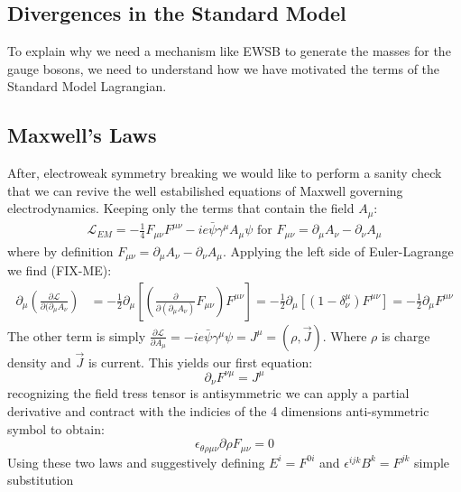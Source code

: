 \subsection{Divergences in the Standard Model} 

To explain why we need a mechanism like EWSB to generate the masses for the gauge bosons, we need to understand how we
have motivated the terms of the Standard Model Lagrangian. 

\subsection{Maxwell's Laws} 

After, electroweak symmetry breaking we would like to perform a sanity check that we can revive the well estabilished equations of
Maxwell governing electrodynamics. 
Keeping only the terms that contain the field $A_\mu$:
\begin{align*}
\mathcal{L}_{EM} = -\frac{1}{4} F_{\mu\nu} F^{\mu\nu}  - ie \bar{\psi} \gamma^\mu A_\mu \psi \text{ for } F_{\mu\nu} = \partial_\mu A_\nu - \partial_\nu A_\mu 
\end{align*}
where by definition $F_{\mu\nu} = \partial_\mu A_\nu - \partial_\nu A_\mu$. Applying the left side of Euler-Lagrange we find (FIX-ME):
\begin{align*}
\partial_\mu \left (\frac{\partial \mathcal L}{\partial(\partial_\mu A_\nu} \right) &=  
-\frac{1}{2}\partial_\mu \left [ \left (\frac{\partial}{\partial(\partial_\mu A_\nu)} F_{\mu\nu} \right) F^{\mu\nu} \right ] 
= - \frac{1}{2} \partial_\mu \left [(1 - \delta^\mu_\nu) F^{\mu\nu} \right ]
= - \frac{1}{2} \partial_\mu F^{\mu\nu}
\end{align*}
The other term is simply $\frac{\partial \mathcal L}{\partial A_\mu} = -ie \bar \psi \gamma^\mu  \psi = J^\mu = (\rho, \vec J)$. Where $\rho$ is charge
density and $\vec J$ is current. This yields our first equation:
\begin{equation}
\partial_\nu F^{\nu\mu} = J^\mu
\end{equation}
recognizing the field tress tensor is antisymmetric we can apply a partial derivative and contract with the indicies of the 4 dimensions anti-symmetric symbol
to obtain:
\begin{equation}
\epsilon_{\theta\rho\mu\nu} \partial{\rho} F_{\mu\nu} = 0 
\end{equation}
Using these two laws and suggestively defining $E^i = F^{0i}$ and $\epsilon^{ijk}B^k = F^{jk}$  simple substitution 

